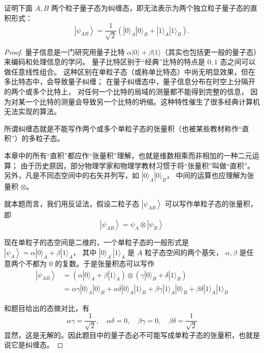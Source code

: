 \begin{2}
    证明下面 $A, B$ 两个粒子量子态为纠缠态，即无法表示为两个独立粒子量子态的直积形式：
$$\left|\psi_{A B}\right\rangle
=\frac{1}{\sqrt{2}}\left(|0\rangle_{A}|0\rangle_{B}+|1\rangle_{A}|1\rangle_{B}\right).$$
\end{2}
\begin{proof}
量子信息是一门研究用量子比特 $\alpha|0\rangle+\beta|1\rangle$（其实也包括更一般的量子态）来编码和处理信息的学问。
量子比特区别于``经典''比特的特点是 $0,1$ 态之间可以做任意线性组合。
这种区别在单粒子态（或称单比特态）中尚无明显效果，但在多比特态中，会导致量子纠缠；
在量子纠缠态中，量子信息分布在时空上分隔开的两个或多个比特上，
对任何一个比特的局域的测量都不能得到完整的信息，
因为对某一个比特的测量会导致另一个比特的坍缩。这种特性催生了很多经典计算机无法实现的算法。

所谓纠缠态就是不能写作两个或多个单粒子态的张量积（也被某些教材称作``直积''）的多粒子态。
\begin{remark*}
本章中的所有``直积''都应作``张量积''理解，也就是维数相乘而非相加的一种二元运算；
由于历史原因，部分物理学家和物理学教材习惯于将``张量积''叫做``直积''。
另外，凡是不同态空间中的右矢并列写，如 $|0\rangle_{A}|0\rangle_{B}$，
中间的运算也应理解为张量积 $\otimes$。
\end{remark*}
就本题而言，我们用反证法，假设二粒子态 $\left|\psi_{A B}\right\rangle$ 可以写作单粒子态的张量积，即
$$\left|\psi_{A B}\right\rangle=\psi_{A} \otimes\left|\psi_{B}\right\rangle$$

现在单粒子的态空间是二维的，一个单粒子态的一般形式是 $\left|\psi_{A}\right\rangle=\alpha|0\rangle_{A}+\beta|1\rangle_{A}$，
其中 $|0\rangle_{A^{\prime}}|1\rangle_{A}$ 是 $A$ 粒子态空间的两个基矢，
$\alpha, \beta$ 是任意两个不都为 $0$ 的复数。于是张量积态可以写作
$$\begin{aligned}
\left|\psi_{A B}\right\rangle & =\left(\alpha|0\rangle_{A}+\beta|1\rangle_{A}\right) \otimes\left(\gamma|0\rangle_{B}+\delta|1\rangle_{B}\right) \\
& =\alpha \gamma|0\rangle_{A}|0\rangle_{B}+\alpha \delta|0\rangle_{A}|1\rangle_{B}+\beta \gamma|1\rangle_{A}|0\rangle_{B}+\beta \delta|1\rangle_{A}|1\rangle_{B}
\end{aligned}$$

和题目给出的态做对比，有
$$\alpha \gamma=\frac{1}{\sqrt{2}}, \quad \alpha \delta=0, 
\quad \beta \gamma=0, \quad \beta \delta=\frac{1}{\sqrt{2}}$$
显然，这是无解的。因此题目中的量子态必不可能写成单粒子态的张量积，也就是说它是纠缠态。
\end{proof}

